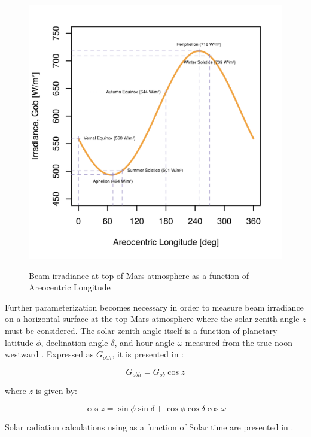 \begin{figure}[H]
  \centering
  \hypersetup{linkcolor=captionTextColor}
  \includegraphics[width=0.5\linewidth]{sections/mars-solar-energy/solar-radiation/plots/gob-daily-variations.png}\\
  \caption[Beam irradiance at top of Mars atmosphere as a function of Areocentric Longitude]
          {Beam irradiance at top of Mars atmosphere as a function of Areocentric Longitude}
  \label{fig:plot:beam-irradiance-top-of-mars-atmosphere}
\end{figure}

Further parameterization becomes necessary in order to measure beam irradiance on a horizontal surface at the top Mars atmosphere where the solar zenith angle $z$ must be considered. The solar zenith angle itself is a function of planetary latitude $\phi$, declination angle $\delta$, and hour angle $\omega$ measured from the true noon westward . Expressed as $G_{obh}$, it is presented in :

\begin{equation}
  \label{eq:G_obh}
  G_{obh} = G_{ob}\cos{z}
\end{equation}

where $z$ is given by:

\begin{equation}
  \label{eq:cosz}
  \cos{z} = \sin{\phi}\sin{\delta} + \cos{\phi}\cos{\delta}\cos{\omega}
\end{equation}

Solar radiation calculations using  as a function of Solar time are presented in .

